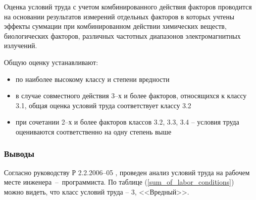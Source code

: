 Оценка условий труда с учетом комбинированного действия факторов проводится на
основании результатов измерений отдельных факторов в которых учтены эффекты
суммации при комбинированном действии химических веществ, биологических факторов,
различных частотных диапазонов электромагнитных излучений.

Общую оценку устанавливают:

\begin{itemize}
    \item   по наиболее высокому классу и степени вредности
    \item   в случае совместного действия 3--х и более факторов, относящихся к классу
            3.1, общая оценка условий труда соответствует классу 3.2
    \item   при сочетании 2--х и более факторов классов 3.2, 3.3, 3.4 -- условия
            труда оцениваются соответственно на одну степень выше
\end{itemize}



\subsubsection{Выводы}

Согласно руководству Р 2.2.2006--05 \cite{ecology_man_2_2_2006_05}, проведен анализ
условий труда на рабочем месте инженера~--~программиста. По таблице
(\ref{sum_of_labor_conditions}) можно видеть, что класс условий труда – 3, <<Вредный>>.
